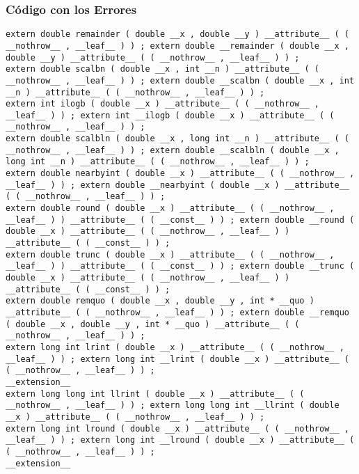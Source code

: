 \documentclass{beamer}
\begin{document}
\begin{frame}[fragile]
\frametitle{C\'odigo con los Errores}
\begin{verbatim}
extern double remainder ( double __x , double __y ) __attribute__ ( ( __nothrow__ , __leaf__ ) ) ; extern double __remainder ( double __x , double __y ) __attribute__ ( ( __nothrow__ , __leaf__ ) ) ; 
extern double scalbn ( double __x , int __n ) __attribute__ ( ( __nothrow__ , __leaf__ ) ) ; extern double __scalbn ( double __x , int __n ) __attribute__ ( ( __nothrow__ , __leaf__ ) ) ; 
extern int ilogb ( double __x ) __attribute__ ( ( __nothrow__ , __leaf__ ) ) ; extern int __ilogb ( double __x ) __attribute__ ( ( __nothrow__ , __leaf__ ) ) ; 
extern double scalbln ( double __x , long int __n ) __attribute__ ( ( __nothrow__ , __leaf__ ) ) ; extern double __scalbln ( double __x , long int __n ) __attribute__ ( ( __nothrow__ , __leaf__ ) ) ; 
extern double nearbyint ( double __x ) __attribute__ ( ( __nothrow__ , __leaf__ ) ) ; extern double __nearbyint ( double __x ) __attribute__ ( ( __nothrow__ , __leaf__ ) ) ; 
extern double round ( double __x ) __attribute__ ( ( __nothrow__ , __leaf__ ) ) __attribute__ ( ( __const__ ) ) ; extern double __round ( double __x ) __attribute__ ( ( __nothrow__ , __leaf__ ) ) __attribute__ ( ( __const__ ) ) ; 
extern double trunc ( double __x ) __attribute__ ( ( __nothrow__ , __leaf__ ) ) __attribute__ ( ( __const__ ) ) ; extern double __trunc ( double __x ) __attribute__ ( ( __nothrow__ , __leaf__ ) ) __attribute__ ( ( __const__ ) ) ; 
extern double remquo ( double __x , double __y , int * __quo ) __attribute__ ( ( __nothrow__ , __leaf__ ) ) ; extern double __remquo ( double __x , double __y , int * __quo ) __attribute__ ( ( __nothrow__ , __leaf__ ) ) ; 
extern long int lrint ( double __x ) __attribute__ ( ( __nothrow__ , __leaf__ ) ) ; extern long int __lrint ( double __x ) __attribute__ ( ( __nothrow__ , __leaf__ ) ) ; 
__extension__ 
extern long long int llrint ( double __x ) __attribute__ ( ( __nothrow__ , __leaf__ ) ) ; extern long long int __llrint ( double __x ) __attribute__ ( ( __nothrow__ , __leaf__ ) ) ; 
extern long int lround ( double __x ) __attribute__ ( ( __nothrow__ , __leaf__ ) ) ; extern long int __lround ( double __x ) __attribute__ ( ( __nothrow__ , __leaf__ ) ) ; 
__extension__ 
\end{verbatim}
\end{frame}
\end{document}
